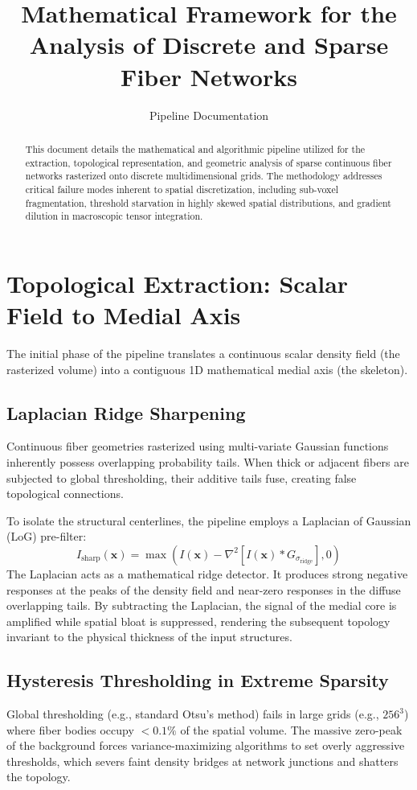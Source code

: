 \documentclass[11pt, a4paper]{article}
\title{\textbf{Mathematical Framework for the Analysis of Discrete and Sparse Fiber Networks}}
\author{Pipeline Documentation}
\date{}
\begin{document}
\maketitle

\begin{abstract}
This document details the mathematical and algorithmic pipeline utilized for the extraction, topological representation, and geometric analysis of sparse continuous fiber networks rasterized onto discrete multidimensional grids. The methodology addresses critical failure modes inherent to spatial discretization, including sub-voxel fragmentation, threshold starvation in highly skewed spatial distributions, and gradient dilution in macroscopic tensor integration.
\end{abstract}

\section{Topological Extraction: Scalar Field to Medial Axis}
The initial phase of the pipeline translates a continuous scalar density field (the rasterized volume) into a contiguous 1D mathematical medial axis (the skeleton).

\subsection{Laplacian Ridge Sharpening}
Continuous fiber geometries rasterized using multi-variate Gaussian functions inherently possess overlapping probability tails. When thick or adjacent fibers are subjected to global thresholding, their additive tails fuse, creating false topological connections.

To isolate the structural centerlines, the pipeline employs a Laplacian of Gaussian (LoG) pre-filter:
\begin{equation}
    I_{\text{sharp}}(\bm{x}) = \max\left( I(\bm{x}) - \nabla^2 \left[ I(\bm{x}) * G_{\sigma_{\text{ridge}}} \right], 0 \right)
\end{equation}
The Laplacian acts as a mathematical ridge detector. It produces strong negative responses at the peaks of the density field and near-zero responses in the diffuse overlapping tails. By subtracting the Laplacian, the signal of the medial core is amplified while spatial bloat is suppressed, rendering the subsequent topology invariant to the physical thickness of the input structures.

\subsection{Hysteresis Thresholding in Extreme Sparsity}
Global thresholding (e.g., standard Otsu's method) fails in large grids (e.g., $256^3$) where fiber bodies occupy $< 0.1\%$ of the spatial volume. The massive zero-peak of the background forces variance-maximizing algorithms to set overly aggressive thresholds, which severs faint density bridges at network junctions and shatters the topology.
\end{document}
